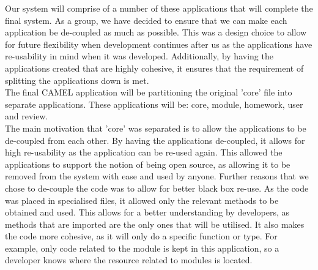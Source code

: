 		Our system will comprise of a number of these applications that will complete the final system. As a group, we have decided to ensure that we can make each application be de-coupled as much as possible. This was a design choice to allow for future flexibility when development continues after us as the applications have re-usability in mind when it was developed. Additionally, by having the applications created that are highly cohesive, it ensures that the requirement of splitting the applications down is met.\\
		
		The final CAMEL application will be partitioning the original 'core' file into separate applications. These applications will be: core, module, homework, user and review.\\
		
		The main motivation that 'core' was separated is to allow the applications to be de-coupled from each other. By having the applications de-coupled, it allows for high re-usability as the application can be re-used again. This allowed the applications to support the notion of being open source, as allowing it to be removed from the system with ease and used by anyone. Further reasons that we chose to de-couple the code was to allow for better black box re-use. As the code was placed in specialised files, it allowed only the relevant methods to be obtained and used. This allows for a better understanding by developers, as methods that are imported are the only ones that will be utilised. It also makes the code more cohesive, as it will only do a specific function or type. For example, only code related to the module is kept in this application, so a developer knows where the resource related to modules is located.\\   